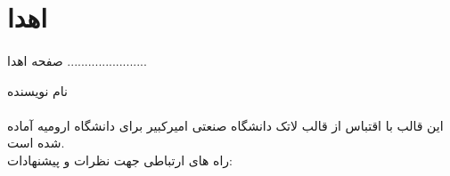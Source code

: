 
\section*{اهدا}

\paragraph*{}
صفحه اهدا .......................

\centerline{نام نویسنده}

\paragraph*{}

این قالب با اقتباس از قالب لاتک دانشگاه صنعتی امیرکبیر برای دانشگاه ارومیه آماده شده است.
\\
راه های ارتباطی جهت نظرات و پیشنهادات:
\\
\begin{flushleft}
	\\
	\\
\end{flushleft}
